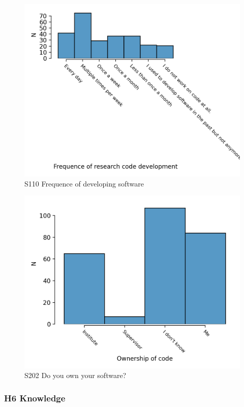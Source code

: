 \documentclass{article}
\begin{document}
\begin{figure}[!p]
    \centering
    \includegraphics[width=\textwidth]{../figs/S110.png}
	\caption{S110 Frequence of developing software}
    \label{fig:S110}
\end{figure}

\begin{figure}[!p]
    \centering
    \includegraphics[width=\textwidth]{../figs/S202.png}
	\caption{S202 Do you own your software?}
    \label{fig:S202}
\end{figure}

\newpage
\subsubsection{H6 Knowledge}
\end{document}
